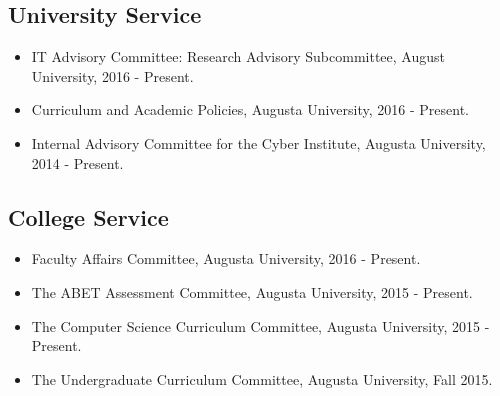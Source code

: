 \documentclass{article}
\begin{document}
  \subsection{University Service}
  \label{subsec:university_service}
  \begin{itemize}
  \item[] IT Advisory Committee: Research Advisory Subcommittee,
    August University, 2016 - Present.
  \item[] Curriculum and Academic Policies, Augusta University, 2016 - Present. 
  \item[] Internal Advisory Committee for the Cyber Institute, Augusta University, 2014 - Present.
  \end{itemize}

  \subsection{College Service}
  \label{subsec:college_service}
  \begin{itemize}
  \item[] Faculty Affairs Committee, Augusta University, 2016 - Present.
  \item[] The ABET Assessment Committee, Augusta University, 2015 - Present. 
  \item[] The Computer Science Curriculum Committee, Augusta University, 2015 - Present.
  \item[] The Undergraduate Curriculum Committee, Augusta University, Fall 2015.     
  \end{itemize}
\end{document}
